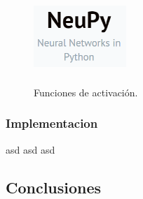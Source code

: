 \documentclass[12pt]{article}
\newcounter{subsubsubsection}[subsubsection]
\begin{document}
\begin{figure}[h]
\includegraphics[width=3.5cm, height=3.5cm]{neupy}
\centering
\caption{Funciones de activación.}
\label{fig:FUNCACT}
\end{figure}

\subsubsection{Implementacion}

asd
asd
asd

\subsection{Conclusiones}




\end{document}
